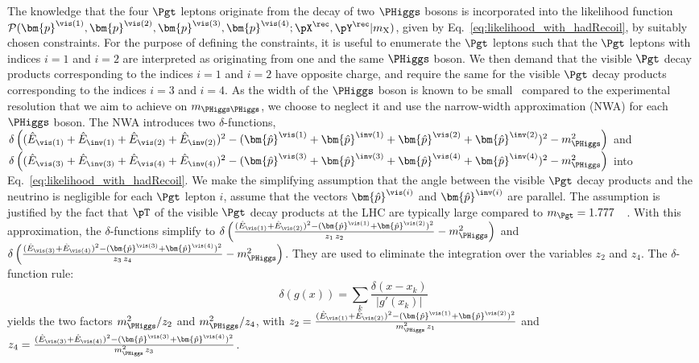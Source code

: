 The knowledge that the four $\Pgt$ leptons originate from the decay of two $\PHiggs$ bosons is incorporated into the likelihood function 
$\mathcal{P}(\bm{p}^{\vis(1)},\bm{p}^{\vis(2)},\bm{p}^{\vis(3)},\bm{p}^{\vis(4)};\pX^{\rec},\pY^{\rec}|m_{\textrm{X}})$,
given by Eq.~\ref{eq:likelihood_with_hadRecoil}, by suitably chosen constraints.
For the purpose of defining the constraints, it is useful to enumerate the $\Pgt$ leptons 
such that the $\Pgt$ leptons with indices $i=1$ and $i=2$ are interpreted as originating from one and the same $\PHiggs$ boson.
We then demand that the visible $\Pgt$ decay products corresponding to the indices $i=1$ and $i=2$ have opposite charge,
and require the same for the visible $\Pgt$ decay products corresponding to the indices $i=3$ and $i=4$.
As the width of the $\PHiggs$ boson is known to be small~\cite{HIG-14-002,Aad:2015xua} compared to the experimental resolution that we aim to achieve on $m_{\PHiggs\PHiggs}$,
we choose to neglect it and use the narrow-width approximation (NWA) for each $\PHiggs$ boson.
The NWA introduces two $\delta$-functions, 
$\delta\left( (\hat{E}_{\vis(1)} + \hat{E}_{\inv(1)} + \hat{E}_{\vis(2)} + \hat{E}_{\inv(2)})^{2} - (\bm{\hat{p}}^{\vis(1)} + \bm{\hat{p}}^{\inv(1)} + \bm{\hat{p}}^{\vis(2)} + \bm{\hat{p}}^{\inv(2)})^{2} - m_{\PHiggs}^{2} \right)$ 
and 
$\delta\left( (\hat{E}_{\vis(3)} + \hat{E}_{\inv(3)} + \hat{E}_{\vis(4)} + \hat{E}_{\inv(4)})^{2} - (\bm{\hat{p}}^{\vis(3)} + \bm{\hat{p}}^{\inv(3)} + \bm{\hat{p}}^{\vis(4)} + \bm{\hat{p}}^{\inv(4)})^{2} - m_{\PHiggs}^{2} \right)$ 
into Eq.~\ref{eq:likelihood_with_hadRecoil}.
We make the simplifying assumption that the angle between the visible $\Pgt$ decay products and the neutrino is negligible for each $\Pgt$ lepton $i$,
\ie assume that the vectors $\bm{\hat{p}}^{\vis(i)}$ and $\bm{\hat{p}}^{\inv(i)}$ are parallel.
The assumption is justified by the fact that $\pT$ of the visible $\Pgt$ decay products at the LHC are typically large compared to $m_{\Pgt} = 1.777$~\GeV~\cite{PDG}.
With this approximation, the $\delta$-functions simplify to 
$\delta\left(\frac{(\hat{E}_{\vis(1)} + \hat{E}_{\vis(2)})^{2} - (\bm{\hat{p}}^{\vis(1)} + \bm{\hat{p}}^{\vis(2)})^{2}}{z_{1} \, z_{2}} - m_{\PHiggs}^{2}\right)$ 
and 
$\delta\left(\frac{(\hat{E}_{\vis(3)} + \hat{E}_{\vis(4)})^{2} - (\bm{\hat{p}}^{\vis(3)} + \bm{\hat{p}}^{\vis(4)})^{2}}{z_{3} \, z_{4}} - m_{\PHiggs}^{2}\right)$.
They are used to eliminate the integration over the variables $z_{2}$ and $z_{4}$.
The $\delta$-function rule:
\begin{equation*} 
\delta \left( g(x) \right) = \sum_{k} \frac{\delta \left( x - x_{k}
  \right)}{\vert g'(x_{k}) \vert} 
\end{equation*}
yields the two factors $m_{\PHiggs}^{2}/z_{2}$ and $m_{\PHiggs}^{2}/z_{4}$,
with 
$z_{2} = \frac{(\hat{E}_{\vis(1)} + \hat{E}_{\vis(2)})^{2} - (\bm{\hat{p}}^{\vis(1)} + \bm{\hat{p}}^{\vis(2)})^{2}}{m_{\PHiggs}^{2} \, z_{1}}$ 
and 
$z_{4} = \frac{(\hat{E}_{\vis(3)} + \hat{E}_{\vis(4)})^{2} - (\bm{\hat{p}}^{\vis(3)} + \bm{\hat{p}}^{\vis(4)})^{2}}{m_{\PHiggs}^{2} \, z_{3}}$.

